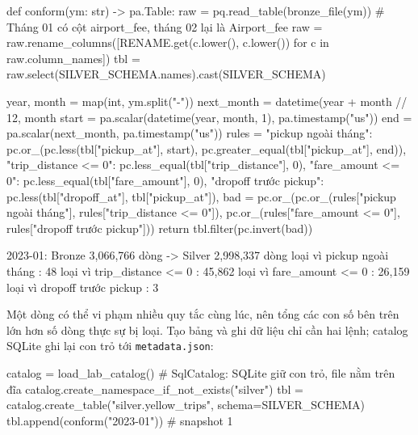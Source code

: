 \documentclass[12pt]{article}
\begin{document}
\begin{aivncodebox}
\begin{python}
def conform(ym: str) -> pa.Table:
    raw = pq.read_table(bronze_file(ym))
    # Tháng 01 có cột airport_fee, tháng 02 lại là Airport_fee
    raw = raw.rename_columns([RENAME.get(c.lower(), c.lower())
                              for c in raw.column_names])
    tbl = raw.select(SILVER_SCHEMA.names).cast(SILVER_SCHEMA)

    year, month = map(int, ym.split("-"))
    next_month = datetime(year + month // 12, month %
    start = pa.scalar(datetime(year, month, 1), pa.timestamp("us"))
    end = pa.scalar(next_month, pa.timestamp("us"))
    rules = {
        "pickup ngoài tháng": pc.or_(pc.less(tbl["pickup_at"], start),
                                     pc.greater_equal(tbl["pickup_at"], end)),
        "trip_distance <= 0": pc.less_equal(tbl["trip_distance"], 0),
        "fare_amount <= 0": pc.less_equal(tbl["fare_amount"], 0),
        "dropoff trước pickup": pc.less(tbl["dropoff_at"], tbl["pickup_at"]),
    }
    bad = pc.or_(pc.or_(rules["pickup ngoài tháng"], rules["trip_distance <= 0"]),
                 pc.or_(rules["fare_amount <= 0"], rules["dropoff trước pickup"]))
    return tbl.filter(pc.invert(bad))
\end{python}
\end{aivncodebox}

\begin{aivnCodeOutput}[Output]
\begin{python}
2023-01: Bronze 3,066,766 dòng -> Silver 2,998,337 dòng
    loại vì pickup ngoài tháng    :      48
    loại vì trip_distance <= 0    :  45,862
    loại vì fare_amount <= 0      :  26,159
    loại vì dropoff trước pickup  :       3
\end{python}
\end{aivnCodeOutput}

Một dòng có thể vi phạm nhiều quy tắc cùng lúc, nên tổng các con số bên trên lớn hơn số dòng thực sự bị loại. Tạo bảng và ghi dữ liệu chỉ cần hai lệnh; catalog SQLite ghi lại con trỏ tới \texttt{metadata.json}:

\begin{aivncodebox}
\begin{python}
catalog = load_lab_catalog()       # SqlCatalog: SQLite giữ con trỏ, file nằm trên đĩa
catalog.create_namespace_if_not_exists("silver")
tbl = catalog.create_table("silver.yellow_trips", schema=SILVER_SCHEMA)
tbl.append(conform("2023-01"))     # snapshot 1
\end{python}
\end{aivncodebox}
\end{document}
